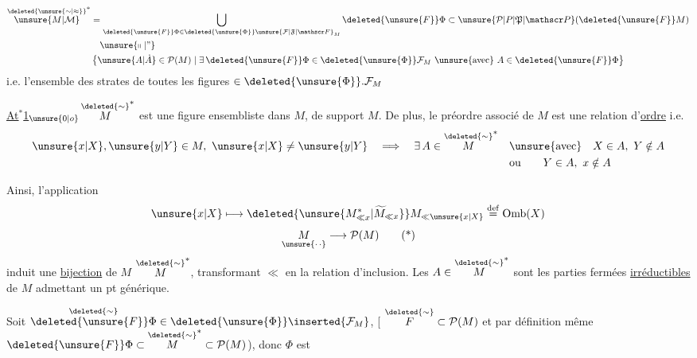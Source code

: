 \[
\begin{aligned}
 \overset{\deleted{\unsure{\sim|\approx}}}{\unsure{M|\mathcal M}}^{*}
  &=\bigcup_{\deleted{\unsure{F}}\Phi\in\deleted{\unsure{\Phi}}\unsure{\mathcal F|\mathfrak F|\mathscr F}_M}
       \deleted{\unsure{F}}\Phi\subset\unsure{\mathcal P|P|\mathfrak P|\mathscr P}(\deleted{\unsure{F}}M)\\
 &\quad\unsure{\shortparallel|\text{''}}\\
 &\left\{\unsure{A|\dot A}\in\mathcal P(M)\mid\exists\,\deleted{\unsure{F}}\Phi\in\deleted{\unsure{\Phi}}\mathcal F_M
       \ \text{\unsure{avec}}\ A\in\deleted{\unsure{F}}\Phi\right\}
\end{aligned}
\]
i.e. l'ensemble des strates de toutes les figures $\in\deleted{\unsure{\Phi}}.\mathcal F_M$

\uline{At$^{*}$1}$_{\unsure{0|o}}$\quad $\overset{\deleted{\sim}}{M}^{*}$ est une figure ensembliste
\margin{\rule{0.45pt}{3.5\baselineskip}}
dans $M$, de support $M$. De plus, le préordre associé de $M$  est une relation d'\uline{ordre} i.e.
\[
\begin{aligned}
 \unsure{x|X},\unsure{y|Y}\in M,\ \unsure{x|X}\neq\unsure{y|Y}\quad\Longrightarrow\quad \exists\, A\in\overset{\deleted{\sim}}{M}^{*}
 &\quad\text{\unsure{avec}}\quad X\in A,\ Y\notin A\\
 &\quad\text{ou}\qquad Y\in A,\ x\notin A
\end{aligned}
\]

Ainsi, l'application
\[
 \unsure{x|X}\longmapsto \deleted{\unsure{M^{*}_{\ll x}|\widetilde M_{\ll x}}}M_{\ll\unsure{x|X}}
 \overset{\mathrm{def}}{=}\mathrm{Omb}(X)
\]
\[
 \underset{\unsure{\cdot\,\cdot}}{M}\longrightarrow\mathcal P(M)\tag*{(*)}
\]
induit une \uline{bijection} de $M$  $\overset{\deleted{\sim}}{M}^{*}$, transformant $\ll$ en la relation d'inclusion.
Les $A\in\overset{\deleted{\sim}}{M}^{*}$ sont les parties fermées \uline{irréductibles} de $M$ admettant un pt générique.

\quad Soit $\overset{\deleted{\sim}}{\deleted{\unsure{F}}\Phi}\in\deleted{\unsure{\Phi}}\inserted{\mathcal F_M}$, [ $\overset{\deleted{\sim}}{F}\subset\mathcal P(M)$ et par définition même $\deleted{\unsure{F}}\Phi\subset\overset{\deleted{\sim}}{M}^{*}\subset\mathcal P(M)$), donc $\Phi$ est
